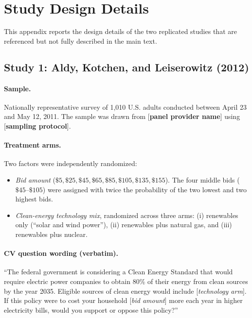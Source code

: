 \documentclass[12pt]{article}
\begin{document}
\newpage
\appendix
\renewcommand{\thefigure}{\thesection.\arabic{figure}}
\renewcommand{\thetable}{\thesection.\arabic{table}}

\section{Study Design Details}\label{app:study-details}

This appendix reports the design details of the two replicated studies that are referenced but not fully described in the main text.

\subsection{Study 1: Aldy, Kotchen, and Leiserowitz (2012)}

\paragraph{Sample.} Nationally representative survey of 1{,}010 U.S. adults conducted between April 23 and May 12, 2011. The sample was drawn from [\textbf{panel provider name}] using [\textbf{sampling protocol}].

\paragraph{Treatment arms.} Two factors were independently randomized:
\begin{itemize}[noitemsep]
    \item \textit{Bid amount} ($\$5, \$25, \$45, \$65, \$85, \$105, \$135, \$155$). The four middle bids ($\$45$--$\$105$) were assigned with twice the probability of the two lowest and two highest bids.
    \item \textit{Clean-energy technology mix}, randomized across three arms: (i) renewables only (``solar and wind power''), (ii) renewables plus natural gas, and (iii) renewables plus nuclear.
\end{itemize}

\paragraph{CV question wording (verbatim).} ``The federal government is considering a Clean Energy Standard that would require electric power companies to obtain 80\% of their energy from clean sources by the year 2035. Eligible sources of clean energy would include [\textit{technology arm}]. If this policy were to cost your household [\textit{bid amount}] more each year in higher electricity bills, would you support or oppose this policy?''
\end{document}
